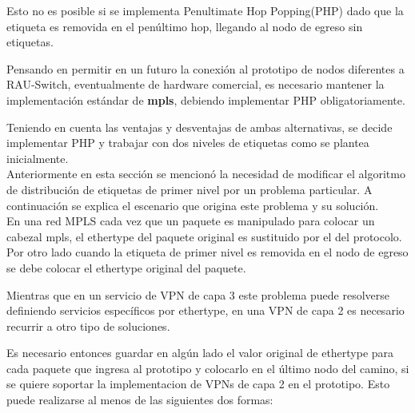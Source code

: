 Esto no es posible si se implementa Penultimate Hop Popping(PHP) dado que la etiqueta es removida en el pen\'ultimo hop, llegando al nodo de egreso sin etiquetas.

Pensando en permitir en un futuro la conexi\'on al prototipo de nodos diferentes a RAU-Switch, eventualmente de hardware comercial, es necesario mantener la implementaci\'on estándar de \textbf{mpls}, debiendo implementar PHP obligatoriamente.

Teniendo en cuenta las ventajas y desventajas de ambas alternativas, se decide implementar PHP y trabajar con dos niveles de etiquetas como se plantea inicialmente.\\

Anteriormente en esta secci\'on se mencion\'o la necesidad de modificar el algoritmo de distribución de etiquetas de primer nivel por un problema particular. A continuaci\'on se explica el escenario que origina este problema y su soluci\'on.\\

En una red MPLS cada vez que un paquete es manipulado para colocar un cabezal mpls, el ethertype del paquete original es sustituido por el del protocolo. Por otro lado cuando la etiqueta de primer nivel es removida en el nodo de egreso se debe colocar el ethertype original del paquete. 

Mientras que en un servicio de VPN de capa 3 este problema puede resolverse definiendo servicios específicos por ethertype, en una VPN de capa 2 es necesario recurrir a otro tipo de soluciones.

Es necesario entonces guardar en alg\'un lado el valor original de ethertype para cada paquete que ingresa al prototipo y colocarlo en el \'ultimo nodo del camino, si se quiere soportar la implementacion de VPNs de capa 2 en el prototipo. Esto puede realizarse al menos de las siguientes dos formas:

